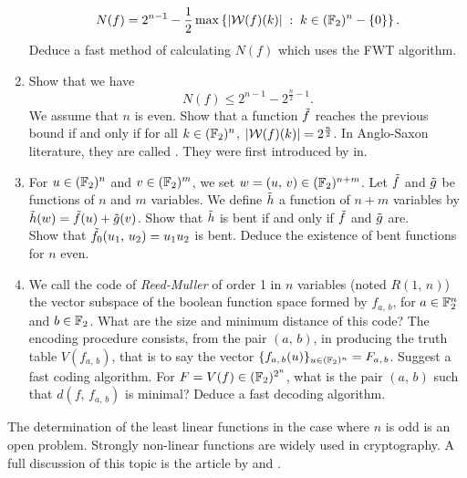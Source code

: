 \begin{exo}
\begin{enumerate}
\begin{equation*}
N (f) = 2^{n-1} - \frac{1}{2} \max \left\{ | \mathcal{W} (f) (k) |  \;:\; k \in (\mathbb{F}_2)^n - \{0\} \right\}.
\end{equation*}
Deduce a fast method of calculating $ N (f) $ which uses the FWT algorithm.
\item {}  Show that we have
\begin{equation*}
N (f) \leq 2^{n-1} - 2^{\frac{n}{2} -1}.
\end{equation*}
We assume that $ n $ is even. Show that a function $ \tilde{f} $ reaches the previous bound if and only if for all $ k \in (\mathbb{F}_2)^n $, $ | \mathcal{W} (f) (k) | = 2^{\frac{n}{2}} $. In Anglo-Saxon literature, they are called . They were first introduced by  in{\upshape \cite{rothaus-bent}}.
\item For $ u \in (\mathbb{F}_2)^n $ and $ v \in (\mathbb{F}_2)^m $, we set $ w = (u, \, v) \in (\mathbb{F}_2)^{n + m } $. Let $ \tilde{f} $ and $ \tilde{g} $ be functions of $ n $ and $ m $ variables. We define $ \tilde{h} $ a function of $ n + m $ variables by $ \tilde{h} (w) = \tilde{f} (u) + \tilde{g} (v) $. Show that $ \tilde{h} $ is bent if and only if $ \tilde{f} $ and $ \tilde{g} $ are. \\Show that $ \tilde{f_0} (u_1, \, u_2) = u_1 u_2 $ is bent. Deduce the existence of bent functions for $ n $ even.
\item {}  We call the code of \textit{Reed-Muller} of order 1 in $ n $ variables (noted $ R (1, \, n) $) the vector subspace of the boolean function space formed by $ f_{a, \, b} $, for $ a \in \mathbb{F}_2^n $ and $ b \in \mathbb{F}_2 $. What are the size and minimum distance of this code? The encoding procedure consists, from the pair $ (a, \, b) $, in producing the truth table $ V (f_{a, \, b}) $, that is to say the vector $ \{f_{a, \, b} (u)\}_{u \in (\mathbb{F}_2)^n} = F_{a, \, b} $. Suggest a fast coding algorithm. For $ F = V (f) \in (\mathbb{F}_2)^{2^n} $, what is the pair $ (a, \, b) $ such that $ d (f, \, f_{a, \, b}) $ is minimal? Deduce a fast decoding algorithm.
\end{enumerate} The determination of the least linear functions in the case where $ n $ is odd is an open problem. Strongly non-linear functions are widely used in cryptography. A full discussion of this topic is the article by  and .
\end{exo}
 
